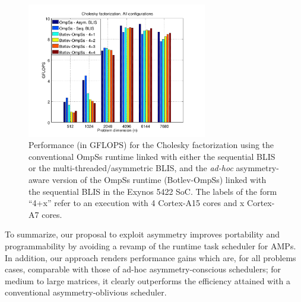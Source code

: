 \begin{figure}
\centering
\includegraphics[width=0.70\textwidth]{Plots/Comparative/comparative}
\caption{Performance (in GFLOPS) for the Cholesky factorization using
         the conventional OmpSs runtime linked with 
         either the sequential BLIS or the multi-threaded/asymmetric BLIS, and the {\em ad-hoc} asymmetry-aware version of the
         OmpSs runtime (Botlev-OmpSs) linked with the sequential BLIS in 
         the Exynos 5422 SoC. The labels of the form ``4+x'' refer to an execution with 4 Cortex-A15 cores and x Cortex-A7 cores.}
\label{fig:comparative}
\end{figure}

To summarize, our proposal to exploit asymmetry improves portability and programmability by avoiding
a revamp of the runtime task scheduler for AMPs. In addition, our approach renders performance
gains which are, for all problems cases, comparable with those of ad-hoc asymmetry-conscious schedulers; 
for medium to large matrices, it clearly outperforms the efficiency attained with a conventional 
asymmetry-oblivious scheduler.


